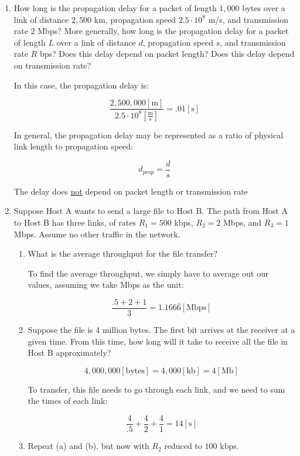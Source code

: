 \begin{enumerate}
  \item How long is the propagation delay for a packet of length $1,000$ bytes over a link of distance $2,500$ km, propagation speed $2.5\cdot10^8$ m/s, and transmission rate $2$ Mbps? More generally, how long is the propagation delay for a packet of length $L$ over a link of distance $d$, propagation speed $s$, and transmission rate $R$ bps? Does this delay depend on packet length?  Does this delay depend on transmission rate?

    In this case, the propagation delay is:

    $$\frac{2,500,000[\si{\meter}]}{2.5\cdot10^{8}\left[ \frac{\si{\meter}}{\si{\second}} \right]}=.01[\si{\second}]$$

    In general, the propagation delay may be represented as a ratio of physical link length to propagation speed:

    $$d_{prop}=\frac{d}{s}$$

    The delay does \underline{not} depend on packet length or transmission rate

  \item Suppose Host A wants to send a large file to Host B. The path from Host A to Host B has three links, of rates $R_1=500$ kbps, $R_2=2$ Mbps, and $R_3=1$ Mbps. Assume no other traffic in the network.

    \begin{enumerate}

      \item What is the average throughput for the file transfer?

        To find the average throughput, we simply have to average out our values, assuming we take Mbps as the unit:

        $$\frac{.5 + 2 + 1}{3}=1.166\bar{6}[\text{Mbps}]$$

      \item Suppose the file is 4 million bytes. The first bit arrives at the receiver at a given time. From this time, how long will it take to receive all the file in Host B approximately?

        $$4,000,000[\text{bytes}]=4,000[\text{kb}]=4[\text{Mb}]$$

        To transfer, this file needs to go through each link, and we need to sum the times of each link:

        $$\frac{4}{.5}+\frac{4}{2}+\frac{4}{1}=14[\si{\second}]$$

      \item Repeat (a) and (b), but now with $R_2$ reduced to $100$ kbps.


\end{enumerate}
\end{enumerate}
